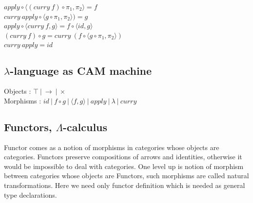 \documentclass[11pt,oneside]{article}
\begin{document}
\begingroup
\parbox[t][][l]{0.40\textwidth}{

\begin{prooftree}
\end{prooftree}

\begin{prooftree}
\end{prooftree}

\begin{prooftree}
\end{prooftree}

}
\hspace{0.1cm}
\parbox[t][][r]{0.60\textwidth}{

\begin{center}
$apply \circ \langle (curry\ f) \circ \pi_1 , \pi_2 \rangle = f$\\
$curry\ apply \circ \langle g \circ \pi_1, \pi_2 \rangle) = g$\\
$apply \circ \langle curry\ f, g \rangle = f \circ \langle id , g\rangle$\\
$(curry\ f) \circ g = curry\ (f \circ \langle g \circ \pi_1,\pi_2\rangle)$\\
$curry\ apply = id$\\
\end{center}


}
\endgroup

\subsection*{$\lambda$-language as CAM machine}

\begin{center}
Objects : $\top\ |\ \rightarrow\ |\ \times$\\
Morphisms : $id\ |\ f \circ g\ |\ \langle f, g \rangle\ |\ apply\ |\ \lambda\ |\ curry$
\end{center}

  \subsection{Functors, $\Lambda$-calculus}

  Functor comes as a notion of morphisms in categories whose objects are categories.
  Functors preserve compositions of arrows and identities, otherwise it would
  be impossible to deal with categories. One level up is notion of morphism between categories whose
  objects are Functors, such morphisms are called natural transformations. Here we need
  only functor definition which is needed as general type declarations.
\end{document}
